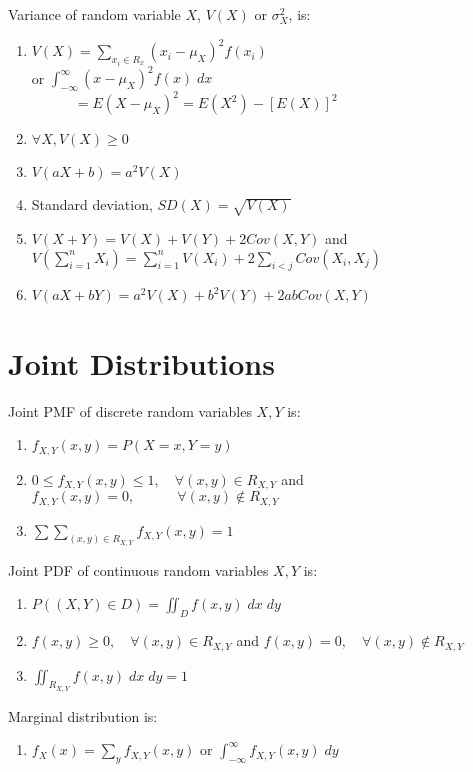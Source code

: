 \documentclass[12pt, a4paper]{article}
\begin{document}
\begin{multicols*}{3}
Variance of random variable $X$, $V(X)$ or $\sigma^2_X$, is:
\begin{enumerate}[\roman*.]
  \item $V(X) = \sum_{x_i\in R_x}(x_i-\mu_X)^2f(x_i)$\\\quad\quad\quad or $\int^{\infty}_{-\infty}(x-\mu_{X})^2f(x)\;dx$\\$\quad\quad\quad= E(X - \mu_X)^2=E(X^2)-[E(X)]^2$
  \item $\forall X, V(X) \geq 0$
  \item $V(aX+b) = a^2V(X)$
  \item Standard deviation, $SD(X) = \sqrt{V(X)}$
  \item $V(X+Y) = V(X) + V(Y) + 2 Cov(X,Y)$ and $V(\sum^n_{i=1}X_i) = \sum^n_{i=1}V(X_i) + 2\sum_{i<j}Cov(X_i, X_j)$
  \item $V(aX+bY) = a^2V(X)+b^2V(Y)+2ab Cov(X,Y)$
\vspace{-1em}
\end{enumerate}
\colbreak
\section{Joint Distributions}
Joint PMF of discrete random variables $X, Y$ is:
\begin{enumerate}[\roman*.]
  \item $f_{X,Y}(x,y) = P(X=x, Y=y)$
  \item $0 \leq f_{X,Y}(x, y) \leq 1,\quad\forall (x, y)\in R_{X,Y}$ and $f_{X,Y}(x,y) = 0,\quad\quad\quad\forall (x,y) \not\in R_{X,Y}$
  \item $\sum\sum_{(x,y)\in R_{X,Y}} f_{X,Y}(x,y) = 1$
\end{enumerate}

Joint PDF of continuous random variables $X, Y $ is:
\begin{enumerate}[\roman*.]
  \item $P((X, Y) \in D) = \iint_{D} f(x, y)\;dx\;dy$
  \item $f(x, y) \geq 0,\quad\forall (x, y)\in R_{X,Y}$ and $f(x,y) = 0,\quad\forall (x,y) \not\in R_{X,Y}$
  \item $\iint_{R_{X, Y}} f(x,y)\;dx\;dy = 1$
\end{enumerate}

Marginal distribution is:
\begin{enumerate}[\roman*.]
  \item $f_X(x) = \sum_y f_{X, Y}(x,y)$ or $\int^{\infty}_{-\infty}f_{X,Y}(x,y)\;dy$
\end{enumerate}


\end{multicols*}
\end{document}
